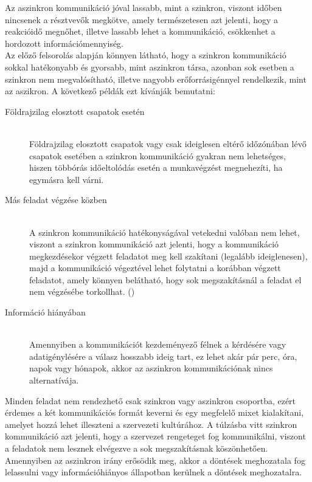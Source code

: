 Az aszinkron kommunikáció jóval lassabb, mint a szinkron, viszont időben nincsenek a résztvevők megkötve, amely természetesen azt jelenti, hogy a reakcióidő megnőhet, illetve lassabb lehet a kommunikáció, csökkenhet a hordozott információmennyiség.\\
\newline
Az előző felsorolás alapján könnyen látható, hogy a szinkron kommunikáció sokkal hatékonyabb és gyorsabb, mint aszinkron társa, azonban sok esetben a szinkron nem megvalósítható, illetve nagyobb erőforrásigénnyel rendelkezik, mint az aszikron. A következő példák ezt kívánják bemutatni:

\begin{description}
  \item [Földrajzilag elosztott csapatok esetén] \hfill\\
  Földrajzilag elosztott csapatok vagy csak ideiglesen eltérő időzónában lévő csapatok esetében a szinkron kommunikáció gyakran nem lehetséges, hiszen többórás időeltolódás esetén a munkavégzést megnehezíti, ha egymásra kell várni.
  \item [Más feladat végzése közben] \hfill\\
  A szinkron kommunikáció hatékonyságával vetekedni valóban nem lehet, viszont a szinkron kommunikáció azt jelenti, hogy a kommunikáció megkezdésekor végzett feladatot meg kell szakítani (legalább ideiglenesen), majd a kommunikáció végeztével lehet folytatni a korábban végzett feladatot, amely könnyen belátható, hogy sok megszakításnál a feladat el nem végzésébe torkollhat. (\cite{demarco1999peopleware})
  \item [Információ hiányában] \hfill\\
  Amennyiben a kommunikációt kezdeményező félnek a kérdésére vagy adatigénylésére a válasz hosszabb ideig tart, ez lehet akár pár perc, óra, napok vagy hónapok, akkor az aszinkron kommunikációnak nincs alternatívája. 
\end{description}

Minden feladat nem rendezhető csak szinkron vagy aszinkron csoportba, ezért érdemes a két kommunikációs formát keverni és egy megfelelő mixet kialakítani, amelyet hozzá lehet illeszteni a szervezeti kultúrához. A túlzásba vitt szinkron kommunikáció azt jelenti, hogy a szervezet rengeteget fog kommunikálni, viszont a feladatok nem lesznek elvégezve a sok megszakításnak köszönhetően. Amennyiben az aszinkron irány erősödik meg, akkor a döntések meghozatala fog lelassulni vagy információhiányos állapotban kerülnek a döntések meghozatalra.

